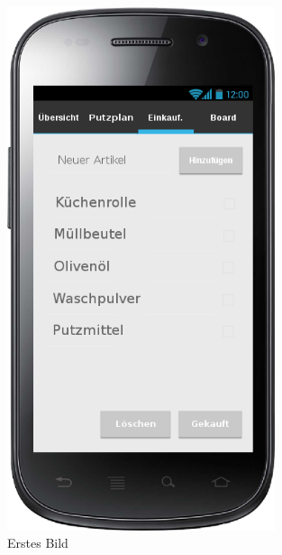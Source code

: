 \begin{figure}[htbp] 
  \centering
     \includegraphics[width=0.7\textwidth]{anhang/mockups/einkaufslisteneuerartikelangefuegt.png}
  \caption{Erstes Bild}
  \label{fig:Bild1}
\end{figure}

